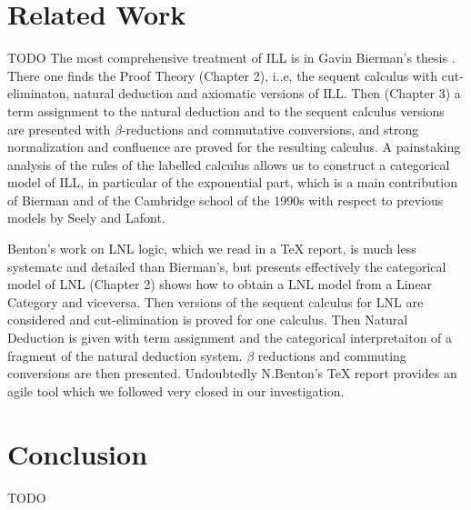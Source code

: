 \documentclass{lmcs}
\begin{document}
\section{Related Work}
\label{sec:related_work}
TODO
The most comprehensive treatment of ILL is in Gavin Bierman's thesis  \cite{Bierman:1994}. 
There one finds the Proof Theory (Chapter 2), i..e, the sequent calculus with cut-eliminaton, natural deduction and 
axiomatic versions of ILL. Then (Chapter 3) a term assignment to the natural deduction and to the sequent calculus
versions are presented with $\beta$-reductions and commutative conversions, and strong normalization and confluence
are proved for the resulting calculus. A painstaking analysis of the rules of the labelled calculus allows us to construct 
a categorical model of ILL, in particular of the exponential part, which is a main contribution of Bierman and of the 
Cambridge school of the 1990s with respect to previous models by Seely and Lafont. 

Benton's work \cite{Benton:1994} on LNL logic, which we read in a TeX report, is much less systematc and detailed 
than Bierman's, but presents effectively the categorical model of LNL (Chapter 2) shows how to obtain a LNL model 
from a Linear Category and viceversa. Then versions of the sequent calculus for LNL are considered  and cut-elimination 
is proved for one calculus. Then Natural Deduction is given with term assignment and the categorical interpretaiton 
of a fragment of the natural deduction system. $\beta$ reductions and commuting conversions are then presented.
Undoubtedly N.Benton's TeX report provides an agile tool which we followed very closed in our investigation.   



\section{Conclusion}
\label{sec:conclusion}
TODO

 

\appendix

\end{document}

